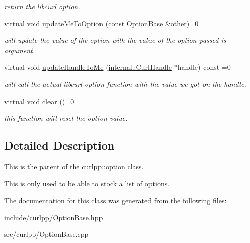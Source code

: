\begin{DoxyCompactItemize}
\begin{DoxyCompactList}\small\item\em return the libcurl option. \end{DoxyCompactList}\item 
\hypertarget{classcurlpp_1_1OptionBase_a6dfedf51cd176e02b46e0e2a2e8fa775}{virtual void \hyperlink{classcurlpp_1_1OptionBase_a6dfedf51cd176e02b46e0e2a2e8fa775}{update\-Me\-To\-Option} (const \hyperlink{classcurlpp_1_1OptionBase}{Option\-Base} \&other)=0}\label{classcurlpp_1_1OptionBase_a6dfedf51cd176e02b46e0e2a2e8fa775}

\begin{DoxyCompactList}\small\item\em will update the value of the option with the value of the option passed is argument. \end{DoxyCompactList}\item 
\hypertarget{classcurlpp_1_1OptionBase_afb0c70db0e956992caa731031ec3c825}{virtual void \hyperlink{classcurlpp_1_1OptionBase_afb0c70db0e956992caa731031ec3c825}{update\-Handle\-To\-Me} (\hyperlink{classcurlpp_1_1internal_1_1CurlHandle}{internal\-::\-Curl\-Handle} $\ast$handle) const =0}\label{classcurlpp_1_1OptionBase_afb0c70db0e956992caa731031ec3c825}

\begin{DoxyCompactList}\small\item\em will call the actual libcurl option function with the value we got on the handle. \end{DoxyCompactList}\item 
\hypertarget{classcurlpp_1_1OptionBase_afa192d6d315eb4cc09ab9002a229c564}{virtual void \hyperlink{classcurlpp_1_1OptionBase_afa192d6d315eb4cc09ab9002a229c564}{clear} ()=0}\label{classcurlpp_1_1OptionBase_afa192d6d315eb4cc09ab9002a229c564}

\begin{DoxyCompactList}\small\item\em this function will reset the option value. \end{DoxyCompactList}\end{DoxyCompactItemize}


\subsection{Detailed Description}
This is the parent of the curlpp\-::option class. 

This is only used to be able to stock a list of options. 

The documentation for this class was generated from the following files\-:\begin{DoxyCompactItemize}
\item 
include/curlpp/Option\-Base.\-hpp\item 
src/curlpp/Option\-Base.\-cpp\end{DoxyCompactItemize}
